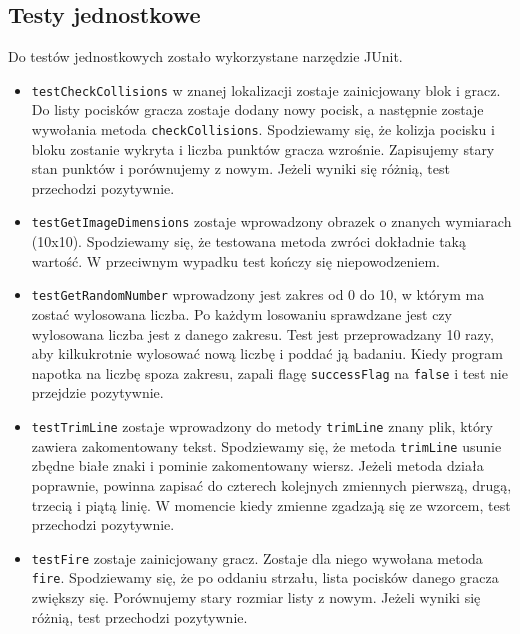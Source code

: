 \documentclass[12pt]{report}
\newcommand{\code}[1]{\texttt{#1}}
\begin{document}
\subsection{Testy jednostkowe}
Do testów jednostkowych zostało wykorzystane narzędzie JUnit.
\begin{itemize}
    \item \code{testCheckCollisions} w znanej lokalizacji zostaje zainicjowany blok i gracz. Do listy pocisków gracza zostaje dodany nowy pocisk, a następnie zostaje wywołania metoda \code{checkCollisions}. Spodziewamy się, że kolizja pocisku i bloku zostanie wykryta i liczba punktów gracza wzrośnie. Zapisujemy stary stan punktów i porównujemy z nowym. Jeżeli wyniki się różnią, test przechodzi pozytywnie.
    \item \code{testGetImageDimensions} zostaje wprowadzony obrazek o znanych wymiarach (10x10). Spodziewamy się, że testowana metoda zwróci dokładnie taką wartość. W przeciwnym wypadku test kończy się niepowodzeniem.
    \item \code{testGetRandomNumber} wprowadzony jest zakres od 0 do 10, w którym ma zostać wylosowana liczba. Po każdym losowaniu sprawdzane jest czy wylosowana liczba jest z danego zakresu. Test jest przeprowadzany 10 razy, aby kilkukrotnie wylosować nową liczbę i poddać ją badaniu. Kiedy program napotka na liczbę spoza zakresu, zapali flagę \code{successFlag} na \code{false} i test nie przejdzie pozytywnie.
    \item \code{testTrimLine} zostaje wprowadzony do metody \code{trimLine} znany plik, który zawiera zakomentowany tekst. Spodziewamy się, że metoda \code{trimLine} usunie zbędne białe znaki i pominie zakomentowany wiersz. Jeżeli metoda działa poprawnie, powinna zapisać do czterech kolejnych zmiennych pierwszą, drugą, trzecią i piątą linię. W momencie kiedy zmienne zgadzają się ze wzorcem, test przechodzi pozytywnie.
    \item \code{testFire} zostaje zainicjowany gracz. Zostaje dla niego wywołana metoda \code{fire}. Spodziewamy się, że po oddaniu strzału, lista pocisków danego gracza zwiększy się. Porównujemy stary rozmiar listy z nowym. Jeżeli wyniki się różnią, test przechodzi pozytywnie.
\end{itemize}
\end{document}
